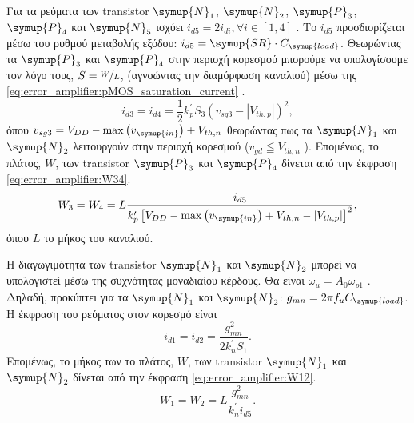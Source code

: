 Για τα ρεύματα των transistor $\symup{N}_1$, $\symup{N}_2$, $\symup{P}_3$, $\symup{P}_4$ και $\symup{N}_5$ ισχύει $i_{d5}=2i_{di},\forall i\in\left[1,4\right]$ \cite{RazaviFundamentals}. Το $i_{d5}$ προσδιορίζεται μέσω του ρυθμού μεταβολής εξόδου: $i_{d5}=\symup{SR}\cdot C_{\symup{load}}$. Θεωρώντας τα $\symup{P}_3$ και $\symup{P}_4$ στην περιοχή κορεσμού μπορούμε να υπολογίσουμε τον λόγο τους, $S=\nicefrac{W}{L}$, (αγνοώντας την διαμόρφωση καναλιού) μέσω της \eqref{eq:error_amplifier:pMOS_saturation_current} \cite{SedraSmith}.
\begin{equation}
	\label{eq:error_amplifier:pMOS_saturation_current}
	i_{d3}=i_{d4}=\frac{1}{2}k_{p}^{\prime}S_{3}\left( v_{sg3} - \left|V_{th,p}\right| \right)^2,
\end{equation}
όπου $v_{sg3}=V_{DD}-\max{\left( v_{\symup{in}} \right)}+V_{th,n}$ θεωρώντας πως τα $\symup{N}_1$ και $\symup{N}_2$ λειτουργούν στην περιοχή κορεσμού ($v_{gd}\leqq V_{th,n}$ \cite{SedraSmith}). Επομένως, το πλάτος, $W$, των transistor $\symup{P}_3$ και $\symup{P}_4$ δίνεται από την έκφραση \eqref{eq:error_amplifier:W34}.
\begin{equation}
	\label{eq:error_amplifier:W34}
	W_{3}=W_{4}=L\frac{i_{d5}}{k_{p}^{\prime} \left[ V_{DD}-\max{\left( v_{\symup{in}} \right)}+V_{th,n}-\left|V_{th,p}\right| \right]^2},
\end{equation}
όπου $L$ το μήκος του καναλιού.\par
Η διαγωγιμότητα των transistor $\symup{N}_1$ και $\symup{N}_2$ μπορεί να υπολογιστεί μέσω της συχνότητας μοναδιαίου κέρδους. Θα είναι $\omega_{u}=A_0\omega_{p1}$ \cite{SedraSmith}. Δηλαδή, προκύπτει για τα $\symup{N}_1$ και $\symup{N}_2$: $g_{mn}=2\pi f_{u}C_{\symup{load}}$. Η έκφραση του ρεύματος στον κορεσμό είναι
\begin{equation}
	i_{d1}=i_{d2}=\frac{g_{mn}^{2}}{2k_{n}^{\prime}S_{1}}.
\end{equation}
Επομένως, το μήκος των το πλάτος, $W$, των transistor $\symup{N}_1$ και $\symup{N}_2$ δίνεται από την έκφραση \eqref{eq:error_amplifier:W12}.
\begin{equation}
	\label{eq:error_amplifier:W12}
	W_1=W_2=L\frac{g_{mn}^{2}}{k_{n}^{\prime}i_{d5}}.
\end{equation}


